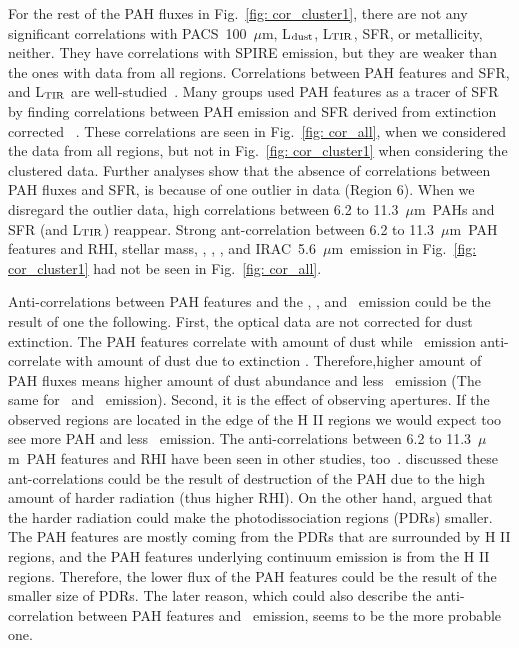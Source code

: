         For the rest of the PAH fluxes in Fig.~\ref{fig: cor_cluster1}, there are not any significant correlations with PACS~100~$\mu$m, L$_{\rm dust}$, L$_{\rm TIR}$, SFR, or metallicity, neither.
        They have correlations with SPIRE emission, but they are weaker than the ones with data from all regions.
        Correlations between PAH features and SFR, and L$_{\rm TIR}$ are well-studied~\citep[e.g.][]{Tielens08,Peeters04}. 
        Many groups used PAH features as a tracer of SFR by finding correlations between 
        PAH emission and SFR derived from extinction corrected \halpha~\citep[e.g.][]{Shipley16,Khramtsova13,Calzetti07}.
        These correlations are seen in Fig.~\ref{fig: cor_all}, when we considered the data from all regions, but not in Fig.~\ref{fig: cor_cluster1} when considering the clustered data.
        Further analyses show that the absence of correlations between PAH fluxes and SFR, is because of one outlier in data (Region 6). 
        When we disregard the outlier data, high correlations between 6.2 to 11.3~$\mu$m~PAHs and SFR (and L$_{\rm TIR}$) reappear.
        Strong ant-correlation between 6.2 to 11.3~$\mu$m~PAH features and RHI, stellar mass, \halpha, \sii, \oiii, and IRAC~5.6~$\mu$m~emission in Fig.~\ref{fig: cor_cluster1} had not be seen in Fig.~\ref{fig: cor_all}.
     
        Anti-correlations between PAH features and the \halpha, \sii, and \oiii~emission could be the result of one the following. 
        First, the optical data are not corrected for dust extinction.
        The PAH features correlate with amount of dust while \halpha~emission anti-correlate with amount of dust due to extinction \citep{Calzetti94}.
        Therefore,higher amount of PAH fluxes means higher amount of dust abundance and less \halpha~emission (The same for \sii~and \oiii~emission).
        Second, it is the effect of observing apertures.
        If the observed regions are located in the edge of the H {\sc II} regions we would expect too see more PAH and less \halpha~emission. %
        The anti-correlations between 6.2 to 11.3~$\mu$m~PAH features and RHI have been seen in other studies, too~\citep[e.g.][]{Dim15, Gordon08, Wu06}.
        \cite{Wu06} discussed these ant-correlations could be the result of destruction of the PAH due to the high amount of harder radiation (thus higher RHI).
        On the other hand, \cite{Gordon08} argued that the harder radiation could make the photodissociation regions (PDRs) smaller.
        The PAH features are mostly coming from the PDRs that are surrounded by H {\sc II} regions, and the PAH features underlying continuum emission is from the H {\sc II} regions.
        Therefore, the lower flux of the PAH features could be the result of the smaller size of PDRs.
        The later reason, which could also describe the anti-correlation between PAH features and \halpha~emission, seems to be the more probable one. 
        
